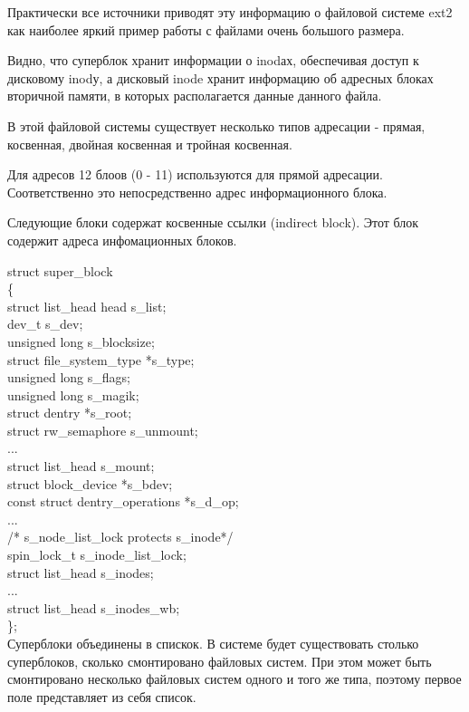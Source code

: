 Практически все источники приводят эту информацию о файловой системе ext2 как наиболее яркий пример работы с файлами очень большого размера. 

Видно, что суперблок хранит информации о inodах, обеспечивая доступ к дисковому inodу, а дисковый inode хранит информацию об адресных блоках вторичной памяти, в которых располагается данные данного файла.

В этой файловой системы существует несколько типов адресации - прямая, косвенная, двойная косвенная и тройная косвенная.

Для адресов 12 блоов (0 - 11) используются для прямой адресации. Соответственно это непосредственно адрес информационного блока.

Следующие блоки содержат косвенные ссылки (indirect block). Этот блок содержит адреса инфомационных блоков.

struct super\_block\\
\{\\
	struct list\_head head s\_list;\\
	dev\_t s\_dev;\\
	unsigned long s\_blocksize;\\
	struct file\_system\_type *s\_type;\\
	unsigned long s\_flags;\\
	unsigned long s\_magik;\\
	struct dentry *s\_root;\\
	struct rw\_semaphore s\_unmount;\\
	...\\
	struct list\_head s\_mount;\\
	struct block\_device *s\_bdev;\\
	
	const struct dentry\_operations *s\_d\_op;\\
	...\\
	/* s\_node\_list\_lock protects s\_inode*/\\
	spin\_lock\_t s\_inode\_list\_lock;\\
	struct list\_head s\_inodes;\\
	...\\
	struct list\_head s\_inodes\_wb;\\
\};\\

Суперблоки объединены в спискок. В системе будет существовать столько суперблоков, сколько смонтировано файловых систем. При этом может быть смонтировано несколько файловых систем одного и того же типа, поэтому первое поле представляет из себя список.

